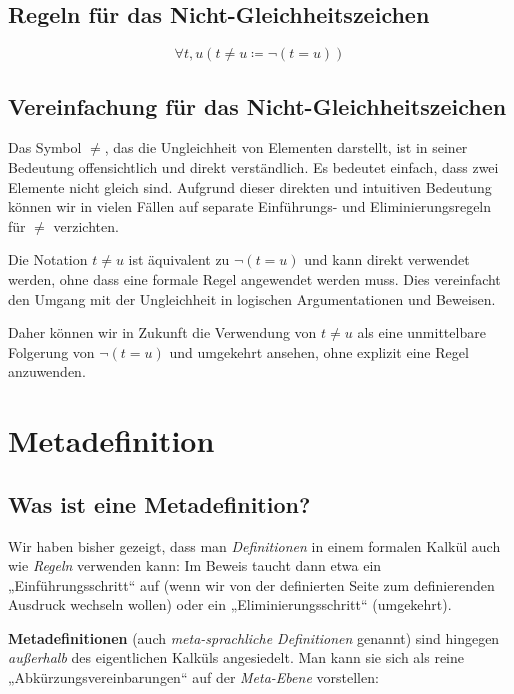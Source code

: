 \documentclass[main.tex]{subfiles}
\begin{document}
\subsection{Regeln für das Nicht-Gleichheitszeichen}

\begin{definition}
\label{rule:Neq}
\[\forall t,u(t\neq u\coloneqq \neg(t=u))\]
\end{definition}


\subsection{Vereinfachung für das Nicht-Gleichheitszeichen}
Das Symbol \(\neq\), das die Ungleichheit von Elementen darstellt, ist in seiner Bedeutung offensichtlich und direkt verständlich. Es bedeutet einfach, dass zwei Elemente nicht gleich sind. Aufgrund dieser direkten und intuitiven Bedeutung können wir in vielen Fällen auf separate Einführungs- und Eliminierungsregeln für \(\neq\) verzichten.

Die Notation \(t \neq u\) ist äquivalent zu \(\neg(t = u)\) und kann direkt verwendet werden, ohne dass eine formale Regel angewendet werden muss. Dies vereinfacht den Umgang mit der Ungleichheit in logischen Argumentationen und Beweisen.

Daher können wir in Zukunft die Verwendung von \(t \neq u\) als eine unmittelbare Folgerung von \(\neg(t = u)\) und umgekehrt ansehen, ohne explizit eine Regel anzuwenden.
\section{Metadefinition}
\subsection{Was ist eine Metadefinition?}


Wir haben bisher gezeigt, dass man \emph{Definitionen} in einem formalen Kalkül auch wie \emph{Regeln} verwenden kann: Im Beweis taucht dann etwa ein „Einführungsschritt“ auf (wenn wir von der definierten Seite zum definierenden Ausdruck wechseln wollen) oder ein „Eliminierungsschritt“ (umgekehrt).  

\medskip

\textbf{Metadefinitionen} (auch \emph{meta-sprachliche Definitionen} genannt) sind hingegen \emph{außerhalb} des eigentlichen Kalküls angesiedelt. Man kann sie sich als reine „Abkürzungsvereinbarungen“ auf der \emph{Meta-Ebene} vorstellen:
\end{document}
